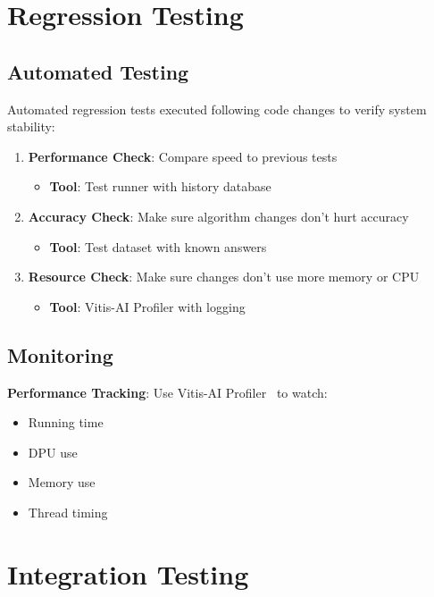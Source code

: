 \section{Regression Testing}\label{sec:regression-testing}

\subsection{Automated Testing}\label{subsec:automated-testing}

Automated regression tests executed following code changes to verify system stability:

\begin{enumerate}
\item \textbf{Performance Check}: Compare speed to previous tests
   \begin{itemize}
   \item \textbf{Tool}: Test runner with history database
   \end{itemize}

\item \textbf{Accuracy Check}: Make sure algorithm changes don't hurt accuracy
   \begin{itemize}
   \item \textbf{Tool}: Test dataset with known answers
   \end{itemize}

\item \textbf{Resource Check}: Make sure changes don't use more memory or CPU
   \begin{itemize}
   \item \textbf{Tool}: Vitis-AI Profiler with logging
   \end{itemize}
\end{enumerate}

\subsection{Monitoring}\label{subsec:monitoring}

\textbf{Performance Tracking}: Use Vitis-AI Profiler~\cite{amd2023vitis} to watch:
\begin{itemize}
\item Running time
\item DPU use
\item Memory use
\item Thread timing
\end{itemize}

\section{Integration Testing}\label{sec:integration-testing}

